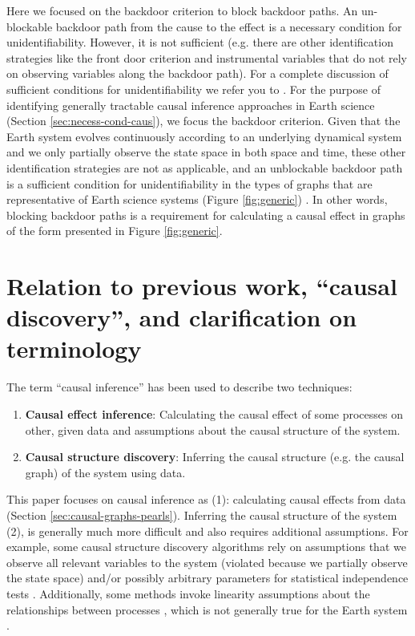 \documentclass[12pt]{article}
\begin{document}
Here we focused on the backdoor criterion to block backdoor paths. An
un-blockable backdoor path from the cause to the effect is a necessary
condition for unidentifiability. However, it is not sufficient
(e.g. there are other identification strategies like the front door
criterion and instrumental variables that do not rely on observing
variables along the backdoor path). For a complete discussion of
sufficient conditions for unidentifiability we refer you to
\citet{shpitser2006}. For the purpose of identifying generally
tractable causal inference approaches in Earth science (Section
\ref{sec:necess-cond-caus}), we focus the backdoor criterion. Given
that the Earth system evolves continuously according to an underlying
dynamical system and we only partially observe the state space in both
space and time, these other identification strategies are not as
applicable, and an unblockable backdoor path is a sufficient condition
for unidentifiability in the types of graphs that are representative
of Earth science systems (Figure \ref{fig:generic})
\citep{tian2002general}. In other words, blocking backdoor paths is a
requirement for calculating a causal effect in graphs of the form
presented in Figure \ref{fig:generic}.

\section{Relation to previous work, ``causal discovery'', and
  clarification on terminology}
\label{sec:discovery}

The term ``causal inference'' has been used to describe two
techniques:

\begin{enumerate}
\item \textbf{Causal effect inference}: Calculating the causal effect
  of some processes on other, given data and assumptions about the
  causal structure of the system.
\item \textbf{Causal structure discovery}: Inferring the causal
  structure (e.g. the causal graph) of the system using data.
\end{enumerate}

This paper focuses on causal inference as (1): calculating causal
effects from data (Section \ref{sec:causal-graphs-pearls}). Inferring
the causal structure of the system (2), is generally much more
difficult and also requires additional assumptions. For example, some
causal structure discovery algorithms rely on assumptions that we
observe all relevant variables to the system (violated because we
partially observe the state space) and/or possibly arbitrary
parameters for statistical independence tests
\citep{runge2019inferring}. Additionally, some methods invoke
linearity assumptions about the relationships between processes
\citep{krich2019causal}, which is not generally true for the Earth
system \citep{palmer-nonlinaer-1999}.
\end{document}
